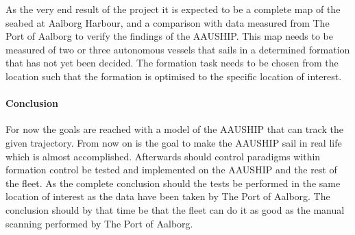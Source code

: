\documentclass[a4paper,12pt]{article}
\begin{document}
As the very end result of the project it is expected to be a complete map of the seabed at Aalborg Harbour, and a comparison with data measured from The Port of Aalborg to verify the findings of the AAUSHIP. This map needs to be measured of two or three autonomous vessels that sails in a determined formation that has not yet been decided. The formation task needs to be chosen from the location such that the formation is optimised to the specific location of interest.
 
\paragraph{Conclusion}
For now the goals are reached with a model of the AAUSHIP that can track the given trajectory. From now on is the goal to make the AAUSHIP sail in real life which is almost accomplished. Afterwards should control paradigms within formation control be tested and implemented on the AAUSHIP and the rest of the fleet. As the complete conclusion should the tests be performed in the same location of interest as the data have been taken by The Port of Aalborg. The conclusion should by that time be that the fleet can do it as good as the manual scanning performed by The Port of Aalborg.
\end{document}

